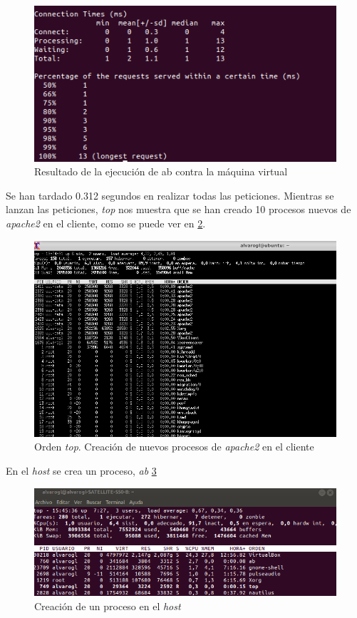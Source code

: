 \begin{figure}[H]
	\centering
	\includegraphics[scale=0.5]{cuestion2-05.png}
	\caption{Resultado de la ejecución de ab contra la máquina virtual} \label{cuestion2-05}
\end{figure}

Se han tardado 0.312 segundos en realizar todas las peticiones.
Mientras se lanzan las peticiones, \textit{top} nos muestra que se han creado 10 procesos nuevos de \textit{apache2} en el cliente, como se puede ver en \ref{cuestion2-03}.

\begin{figure}[H]
	\centering
	\includegraphics[scale=0.45]{cuestion2-03.png}
	\caption{Orden \textit{top}. Creación de nuevos procesos de \textit{apache2} en el cliente} \label{cuestion2-03}
\end{figure}

En el \textit{host} se crea un proceso, \textit{ab} \ref{cuestion2-06}

\begin{figure}[H]
	\centering
	\includegraphics[scale=0.6]{cuestion2-06.png}
	\caption{Creación de un proceso en el \textit{host}} \label{cuestion2-06}
\end{figure}

